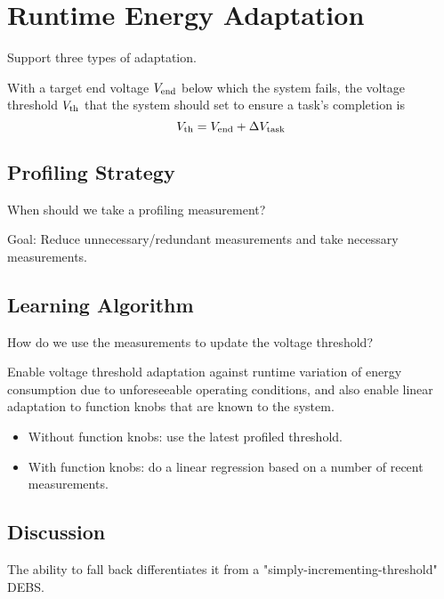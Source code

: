 
\section{\nn{} Runtime Energy Adaptation} \label{sec:method2}

Support three types of adaptation.

With a target end voltage $V_{\text{end}}$ below which the system fails, the voltage threshold $V_{\text{th}}$ that the system should set to ensure a task's completion is
\begin{equation}
    V_{\text{th}} = V_{\text{end}} + \Delta V_{\text{task}}
\end{equation}

\subsection{Profiling Strategy}

When should we take a profiling measurement?

Goal: Reduce unnecessary/redundant measurements and take necessary measurements.

\subsection{Learning Algorithm}

How do we use the measurements to update the voltage threshold?

Enable voltage threshold adaptation against runtime variation of energy consumption due to unforeseeable operating conditions, and also enable linear adaptation to function knobs that are known to the system. 

\begin{itemize}
    \item Without function knobs: use the latest profiled threshold.
    \item With function knobs: do a linear regression based on a number of recent measurements. 
\end{itemize}

\subsection{Discussion}

The ability to fall back differentiates it from a "simply-incrementing-threshold" DEBS.
